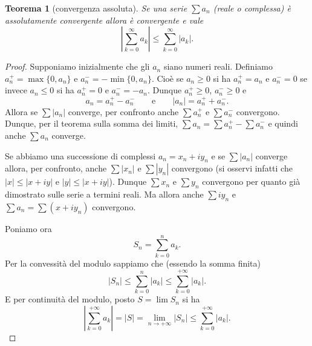\documentclass[italian,a4paper,oneside,headinclude]{scrbook}
\newcommand{\abs}[1]{{\left|#1\right|}}
\newtheorem{theorem}{Teorema}
\begin{document}
\begin{theorem}[convergenza assoluta]
Se una serie $\sum a_n$ (reale o complessa)
è assolutamente convergente allora è convergente e vale
\[
  \abs{\sum_{k=0}^\infty a_k} \le \sum_{k=0}^\infty \abs{a_k}.
\]
\end{theorem}
%
\begin{proof}
Supponiamo inizialmente che gli $a_n$ siano numeri reali.
Definiamo $a_n^+ = \max\{0, a_n\}$ e $a_n^- = -\min \{0, a_n\}$.
Cioè se $a_n\ge 0$ si ha $a_n^+ = a_n$ e $a_n^-=0$ se invece $a_n\le 0$
si ha $a_n^+ =0$ e $a_n^- = -a_n$.
Dunque $a_n^+\ge 0$, $a_n^-\ge 0$ e
\[
   a_n = a_n^+  - a_n^-
   \qquad\text{e}\qquad
   \abs{a_n} = a_n^+ + a_n^-.
\]
Allora se $\sum \abs{a_n}$ converge,
per confronto anche $\sum a_n^+$ e $\sum a_n^-$ convergono.
Dunque, per il teorema sulla somma dei limiti,
$\sum a_n = \sum a_n^+ - \sum a_n^-$
e quindi anche $\sum a_n$ converge.

Se abbiamo una successione di complessi $a_n = x_n + i y_n$
e se
$\sum \abs{a_n}$ converge allora, per confronto,
anche $\sum \abs{x_n}$ e $\sum\abs{y_n}$ convergono
(si osservi infatti che $\abs{x} \le \abs{x+iy}$ e $\abs{y}\le \abs{x+iy}$).
Dunque $\sum x_n$ e $\sum y_n$ convergono per quanto
già dimostrato sulle serie a termini reali.
Ma allora anche $\sum i y_n$ e $\sum a_n = \sum (x + iy_n)$ convergono.

Poniamo ora
\[
  S_n  = \sum_{k=0}^n a_k.
\]
Per la convessità del modulo sappiamo che (essendo la somma finita)
\[
 \abs{S_n} \le \sum_{k=0}^n \abs{a_k} \le \sum_{k=0}^{+\infty} \abs{a_k}.
\]
E per continuità del modulo, posto $S= \lim S_n$ si ha
\[
  \abs{\sum_{k=0}^{+\infty} a_k}
  = \abs{S}
  = \lim_{n\to +\infty} \abs{S_n}
  \le \sum_{k=0}^{+\infty} \abs{a_k}.
\]
\end{proof}
\end{document}
